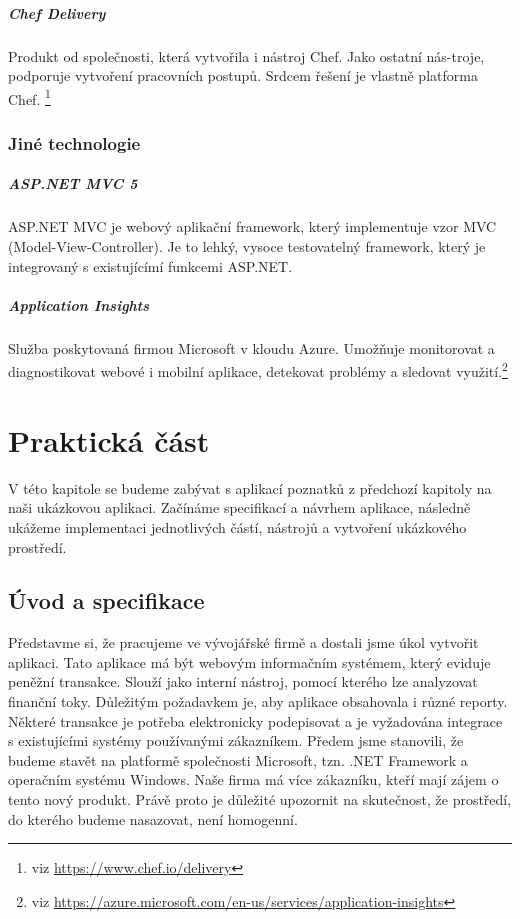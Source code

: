 \paragraph{Chef Delivery}
Produkt od společnosti, která vytvořila i nástroj Chef. Jako ostatní nás-troje, podporuje vytvoření pracovních postupů. Srdcem řešení je vlastně platforma Chef. \footnote{viz \url{https://www.chef.io/delivery}}

\subsection{Jiné technologie}
\paragraph{ASP.NET MVC 5}
ASP.NET MVC je webový aplikační framework, který implementuje vzor MVC (Model-View-Controller). Je to lehký, vysoce testovatelný framework, který je integrovaný s existujícímí funkcemi ASP.NET. \cite{aspnetmvc}

\paragraph{Application Insights}
Služba poskytovaná firmou Microsoft v kloudu Azure. Umožňuje monitorovat a diagnostikovat webové i mobilní aplikace, detekovat problémy a sledovat využití.\footnote{viz \url{https://azure.microsoft.com/en-us/services/application-insights}}

\chapter{Praktická část}
\label{ch:impl}
V této kapitole se budeme zabývat s aplikací poznatků z předchozí kapitoly na naši ukázkovou aplikaci. Začínáme specifikací a návrhem aplikace, následně ukážeme implementaci jednotlivých částí, nástrojů a vytvoření ukázkového prostředí. 

\section{Úvod a specifikace}
Představme si, že pracujeme ve vývojářské firmě a dostali jsme úkol vytvořit aplikaci. Tato aplikace má být webovým informačním systémem, který eviduje peněžní transakce. Slouží jako interní nástroj, pomocí kterého lze analyzovat finanční toky. Důležitým požadavkem je, aby aplikace obsahovala i různé reporty. Některé transakce je potřeba elektronicky podepisovat a je vyžadována integrace s existujícími systémy používanými zákazníkem. Předem jsme stanovili, že budeme stavět na platformě společnosti Microsoft, tzn. .NET Framework a operačním systému Windows. Naše firma má více zákazníku, kteří mají zájem o tento nový produkt. Právě proto je důležité upozornit na skutečnost, že prostředí, do kterého budeme nasazovat, není homogenní.  

